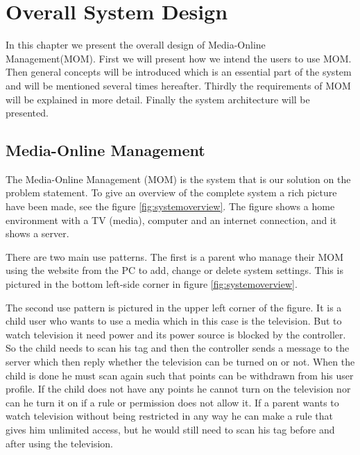 \chapter{Overall System Design}
In this chapter we present the overall design of Media-Online Management(MOM). First we will present how we intend the users to use MOM. Then general concepts will be introduced which is an essential part of the system and will be mentioned several times hereafter. Thirdly the requirements of MOM will be explained in more detail. Finally the system architecture will be presented.    


\section{Media-Online Management} %
The Media-Online Management (MOM) is the system that is our solution on the problem statement. To give an overview of the complete system a rich picture \citep{OOAD} have been made, see the figure \ref{fig:systemoverview}. The figure shows a home environment with a TV (media), computer and an internet connection, and it shows a server. 

There are two main use patterns. The first is a parent who manage their MOM using the website from the PC to add, change or delete system settings. This is pictured in the bottom left-side corner in figure \ref{fig:systemoverview}. 

The second use pattern is pictured in the upper left corner of the figure. It is a child user who wants to use a media which in this case is the television. But to watch television it need power and its power source is blocked by the controller. So the child needs to scan his tag and then the controller sends a message to the server which then reply whether the television can be turned on or not. When the child is done he must scan again such that points can be withdrawn from his user profile. If the child does not have any points he cannot turn on the television nor can he turn it on if a rule or permission does not allow it. If a parent wants to watch television without being restricted in any way he can make a rule that gives him unlimited access, but he would still need to scan his tag before and after using the television. 

